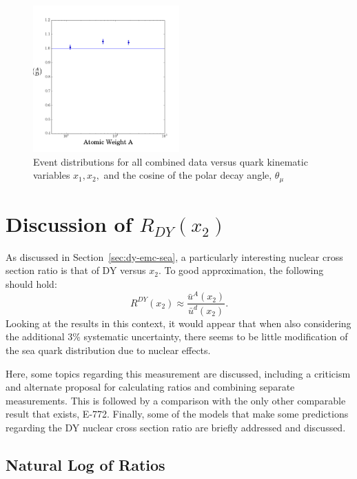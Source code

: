 \begin{figure}
	\centering
	\includegraphics[width=0.5\textwidth]{figures/results/int-DY-A.png}
	\caption{Event distributions for all combined data versus quark kinematic variables $x_1, x_2,$ and the cosine of the polar decay angle, $\theta_\mu$}
	\label{fig:int-dy-a}
\end{figure}

\section{Discussion of $R_{DY}(x_2)$}

As discussed in Section~\ref{sec:dy-emc-sea}, a particularly interesting nuclear cross section ratio is that of DY versus $x_2$. To good approximation, the following should hold:
\begin{equation}
R^{DY}(x_2) \approx \frac{\bar{u}^A(x_2)}{\bar{u}^d(x_2)}.
\end{equation}
Looking at the results in this context, it would appear that when also considering the additional 3\% systematic uncertainty, there seems to be little modification of the sea quark distribution due to nuclear effects.

Here, some topics regarding this measurement are discussed, including a criticism and alternate proposal for calculating ratios and combining separate measurements. This is followed by a comparison with the only other comparable result that exists, E-772. Finally, some of the models that make some predictions regarding the DY nuclear cross section ratio are briefly addressed and discussed.

\subsection{Natural Log of Ratios}

